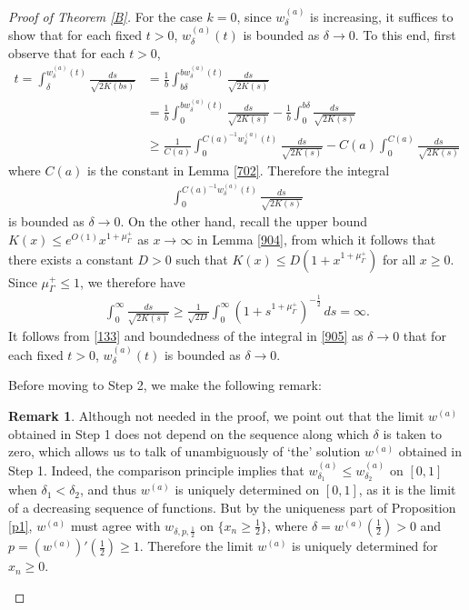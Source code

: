 \documentclass[12pt]{article}
\numberwithin{equation}{section}
\theoremstyle{plain}
\theoremstyle{definition}
\newtheorem{rmk}[thm]{Remark}
\begin{document}
\begin{proof}[Proof of Theorem \ref{B}]
	For the case $k=0$, since $w^{(a)}_\delta$ is increasing, it suffices to show that for each fixed $t>0$, $w^{(a)}_\delta(t)$ is bounded as $\delta\rightarrow 0$. To this end, first observe that for each $t>0$,
	\begin{align*}
	t = \int_\delta^{w_{\delta}^{(a)}(t)} \frac{ds}{\sqrt{2K(bs)}} & = \frac{1}{b}\int_{b\delta}^{bw^{(a)}_\delta(t)} \frac{ds}{\sqrt{2K(s)}} \nonumber \\
	& = \frac{1}{b}\int_{0}^{bw^{(a)}_\delta(t)} \frac{ds}{\sqrt{2K(s)}} - \frac{1}{b}\int_{0}^{b\delta} \frac{ds}{\sqrt{2K(s)}} \nonumber \\
	&  \geq \frac{1}{C(a)}\int_{0}^{C(a)^{-1}w^{(a)}_\delta(t)}\frac{ds}{\sqrt{2K(s)}} - C(a)\int_0^{C(a)}\frac{ds}{\sqrt{2K(s)}}
	\end{align*}
	where $C(a)$ is the constant in Lemma \ref{702}. Therefore the integral 
	\begin{align}\label{905}
	\int_{0}^{C(a)^{-1}w^{(a)}_\delta(t)}\frac{ds}{\sqrt{2K(s)}}
	\end{align}
	is bounded as $\delta\rightarrow 0$. On the other hand, recall the upper bound $K(x) \leq e^{O(1)}x^{1+\mu_\Gamma^+}$ as $x\rightarrow\infty$ in Lemma \ref{904}, from which it follows that there exists a constant $D>0$ such that $K(x) \leq D(1+x^{1+\mu_\Gamma^+})$ for all $x\geq 0$. Since $\mu_\Gamma^+ \leq 1$, we therefore have
	\begin{align}\label{133}
	\int_{0}^\infty \frac{ds}{\sqrt{2K(s)}} \geq \frac{1}{\sqrt{2D}}\int_0^\infty (1+s^{1+\mu_\Gamma^+})^{-\frac{1}{2}}\,ds = \infty.
	\end{align}
	It follows from \eqref{133} and boundedness of the integral in \eqref{905} as $\delta\rightarrow 0$ that for each fixed $t>0$, $w_{\delta}^{(a)}(t)$ is bounded as $\delta\rightarrow 0$. \medskip 
	
	Before moving to Step 2, we make the following remark: 
	
	\begin{rmk}
		Although not needed in the proof, we point out that the limit $w^{(a)}$ obtained in Step 1 does not depend on the sequence along which $\delta$ is taken to zero, which allows us to talk of unambiguously of `the' solution $w^{(a)}$ obtained in Step 1. Indeed, the comparison principle implies that $w_{\delta_1}^{(a)}\leq w_{\delta_2}^{(a)}$ on $[0,1]$ when $\delta_1 < \delta_2$, and thus $w^{(a)}$ is uniquely determined on $[0,1]$, as it is the limit of a decreasing sequence of functions. But by the uniqueness part of Proposition \ref{p1}, $w^{(a)}$ must agree with $w_{\delta, p, \frac{1}{2}}$ on $\{x_n \geq \frac{1}{2}\}$, where $\delta = w^{(a)}(\frac{1}{2})>0$ and $p = (w^{(a)})'(\frac{1}{2}) \geq 1$. Therefore the limit $w^{(a)}$ is uniquely determined for $x_n \geq 0$.
	\end{rmk}
	

\end{proof}
\end{document}
